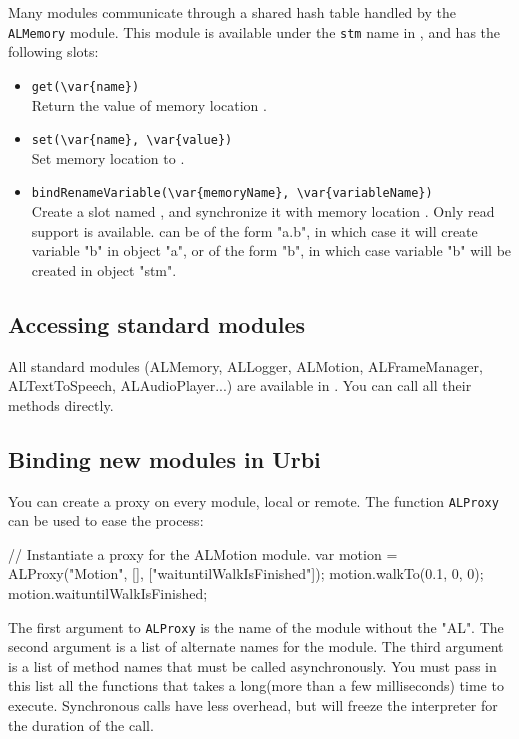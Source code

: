 Many \naoqi modules communicate through a shared hash table handled by
the \lstinline|ALMemory| module. This module is available under the
\lstinline|stm| name in \urbi, and has the following slots:

\begin{itemize}
\item \lstinline|get(\var{name})| \\
  Return the value of memory location .
\item \lstinline|set(\var{name}, \var{value})| \\
  Set memory location  to .
\item \lstinline|bindRenameVariable(\var{memoryName}, \var{variableName})| \\
  Create a \us slot named , and synchronize it with memory
  location . Only read support is available.
   can be of the form "a.b", in which case it will create
  variable "b" in object "a", or of the form "b", in which case variable "b"
  will be created in object "stm".
\end{itemize}

\subsection{Accessing standard \naoqi modules}

All standard \naoqi modules (ALMemory, ALLogger, ALMotion, ALFrameManager,
ALTextToSpeech, ALAudioPlayer...) are available in \urbi. You can call all
their methods directly.

\subsection{Binding new \naoqi modules in Urbi}

You can create a proxy on every \naoqi module, local or remote. The function
\lstinline|ALProxy| can be used to ease the process:

\begin{urbiunchecked}
// Instantiate a proxy for the ALMotion module.
var motion = ALProxy("Motion", [], ["waituntilWalkIsFinished"]);
motion.walkTo(0.1, 0, 0);
motion.waituntilWalkIsFinished;
\end{urbiunchecked}

The first argument to \lstinline|ALProxy| is the name of the module without
the "AL". The second argument is a list of alternate names for the module.
The third argument is a list of method names that must be called asynchronously.
You must pass in this list all the functions that takes a long(more than a few
milliseconds) time to execute. Synchronous calls have less overhead, but will freeze the \us interpreter for the duration of the call.

